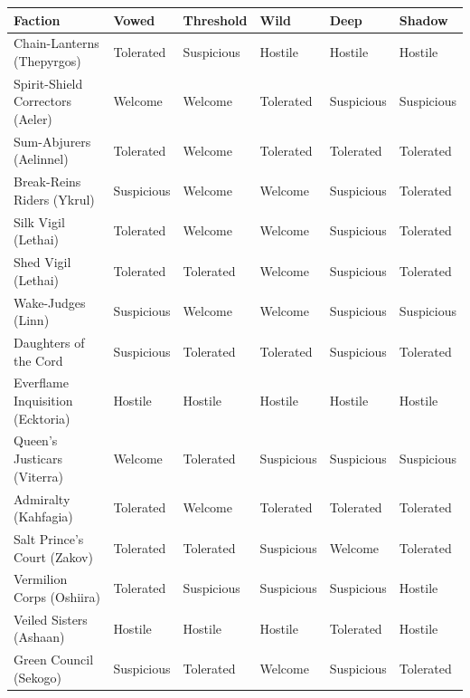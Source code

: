 \begin{table}[h]
\centering
\small
\begin{tabular}{llllll}
\hline
\textbf{Faction} & \textbf{Vowed} & \textbf{Threshold} & \textbf{Wild} & \textbf{Deep} & \textbf{Shadow} \\
\hline
Chain-Lanterns (Thepyrgos) & Tolerated & Suspicious & Hostile & Hostile & Hostile \\
Spirit-Shield Correctors (Aeler) & Welcome & Welcome & Tolerated & Suspicious & Suspicious \\
Sum-Abjurers (Aelinnel) & Tolerated & Welcome & Tolerated & Tolerated & Tolerated \\
Break-Reins Riders (Ykrul) & Suspicious & Welcome & Welcome & Suspicious & Tolerated \\
Silk Vigil (Lethai) & Tolerated & Welcome & Welcome & Suspicious & Tolerated \\
Shed Vigil (Lethai) & Tolerated & Tolerated & Welcome & Suspicious & Tolerated \\
Wake-Judges (Linn) & Suspicious & Welcome & Welcome & Suspicious & Suspicious \\
Daughters of the Cord & Suspicious & Tolerated & Tolerated & Suspicious & Tolerated \\
Everflame Inquisition (Ecktoria) & Hostile & Hostile & Hostile & Hostile & Hostile \\
Queen's Justicars (Viterra) & Welcome & Tolerated & Suspicious & Suspicious & Suspicious \\
Admiralty (Kahfagia) & Tolerated & Welcome & Tolerated & Tolerated & Tolerated \\
Salt Prince's Court (Zakov) & Tolerated & Tolerated & Suspicious & Welcome & Tolerated \\
Vermilion Corps (Oshiira) & Tolerated & Suspicious & Suspicious & Suspicious & Hostile \\
Veiled Sisters (Ashaan) & Hostile & Hostile & Hostile & Tolerated & Hostile \\
Green Council (Sekogo) & Suspicious & Tolerated & Welcome & Suspicious & Tolerated \\
\hline
\end{tabular}
\end{table}

